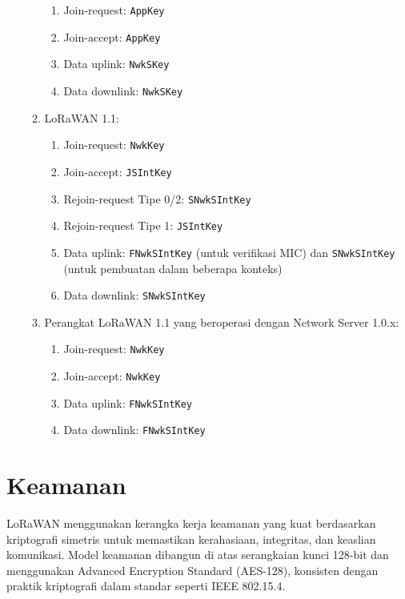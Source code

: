 \begin{enumerate}
\begin{enumerate}
\begin{enumerate}
                        \item Join-request: \texttt{AppKey}
                        \item Join-accept: \texttt{AppKey}
                        \item Data uplink: \texttt{NwkSKey}
                        \item Data downlink: \texttt{NwkSKey}
                    \end{enumerate}
              \item LoRaWAN 1.1:
                    \begin{enumerate}
                        \item Join-request: \texttt{NwkKey}
                        \item Join-accept: \texttt{JSIntKey}
                        \item Rejoin-request Tipe 0/2: \texttt{SNwkSIntKey}
                        \item Rejoin-request Tipe 1: \texttt{JSIntKey}
                        \item Data uplink: \texttt{FNwkSIntKey} (untuk verifikasi MIC) dan \texttt{SNwkSIntKey} (untuk pembuatan dalam beberapa konteks)
                        \item Data downlink: \texttt{SNwkSIntKey}
                    \end{enumerate}
              \item Perangkat LoRaWAN 1.1 yang beroperasi dengan Network Server 1.0.x:
                    \begin{enumerate}
                        \item Join-request: \texttt{NwkKey}
                        \item Join-accept: \texttt{NwkKey}
                        \item Data uplink: \texttt{FNwkSIntKey}
                        \item Data downlink: \texttt{FNwkSIntKey}
                    \end{enumerate}
          \end{enumerate}
\end{enumerate}
\section{Keamanan}
LoRaWAN menggunakan kerangka kerja keamanan yang kuat berdasarkan kriptografi simetris untuk memastikan kerahasiaan, integritas, dan keaslian komunikasi. Model keamanan dibangun di atas serangkaian kunci 128-bit dan menggunakan Advanced Encryption Standard (AES-128), konsisten dengan praktik kriptografi dalam standar seperti IEEE 802.15.4.
